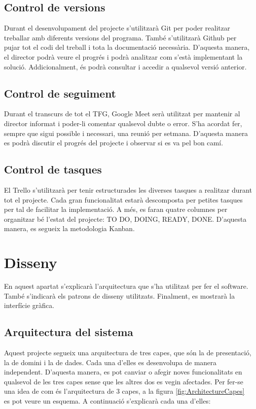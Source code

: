 \documentclass[a4paper]{article}
\begin{document}
\subsection{Control de versions}

Durant el desenvolupament del projecte s'utilitzarà Git per poder realitzar treballar amb diferents versions del programa. També s'utilitzarà Github per pujar tot el codi del treball i tota la documentació necessària. D'aquesta manera, el director podrà veure el progrés i podrà analitzar com s'està implementant la solució. Addicionalment, és podrà consultar i accedir a qualsevol versió anterior.

\subsection{Control de seguiment}
    
Durant el transcurs de tot el TFG, Google Meet serà utilitzat per mantenir al director informat i poder-li comentar qualsevol dubte o error. S'ha acordat fer, sempre que sigui possible i necessari, una reunió per setmana. D'aquesta manera es podrà discutir el progrés del projecte i observar si es va pel bon camí.

\subsection{Control de tasques}

El Trello s'utilitzarà per tenir estructurades les diverses tasques a realitzar durant tot el projecte. Cada gran funcionalitat estarà descomposta per petites tasques per tal de facilitar la implementació. A més, es faran quatre columnes per organitzar bé l'estat del projecte: TO DO, DOING, READY, DONE. D'aquesta manera, es segueix la metodologia Kanban.

\newpage
\section{Disseny}

En aquest apartat s'explicarà l'arquitectura que s'ha utilitzat per fer el software. També s'indicarà els patrons de disseny utilitzats. Finalment, es mostrarà la interfície gràfica.

\subsection{Arquitectura del sistema}
Aquest projecte segueix una arquitectura de tres capes, que són la de presentació, la de domini i la de dades. Cada una d'elles es desenvolupa de manera independent. D'aquesta manera, es pot canviar o afegir noves funcionalitats en qualsevol de les tres capes sense que les altres dos es vegin afectades. Per fer-se una idea de com és l'arquitectura de 3 capes, a la figura \ref{fig:ArchitectureCapes} es pot veure un esquema. A continuació s'explicarà cada una d'elles:
\end{document}

